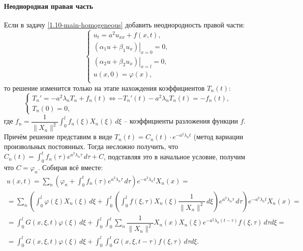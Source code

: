 \paragraph{Неоднородная правая часть} Если в задачу \eqref{1.10-main-homogeneous} добавить 
неоднородность правой части:
\begin{equation}
  \begin{cases}
    u_t = a^2 u_{xx} + f(x, t), \\
    \left. \left( \alpha_1 u + \beta_1 u_x \right) \right|_{x=0} = 0, \\
    \left. \left( \alpha_2 u + \beta_2 u_x \right) \right|_{x = l} = 0, \\
    u(x, 0) = \varphi(x), \\
  \end{cases}
\end{equation}
то решение изменится только на этапе нахождения коэффициентов $T_n(t)$:
\[
  \begin{cases}
    T_n' = - a^2 \lambda_n T_n + f_n(t)
      \Leftrightarrow
      -T_n'(t) - a^2 \lambda_n T_n(t) = - f_n(t), \\
    T_n(0) = 0,
  \end{cases}
\]
где $f_n = \dfrac{1}{\|X_n\|^2} \int_0^l f_n(\xi) X_n(\xi) \, d\xi$ -- коэффициенты разложения
функции $f$. Причём решение представим в виде $T_n(t) = C_n(t) \cdot e^{-a^2 \lambda_n t}$
(метод вариации произвольных постоянных. Тогда несложно получить, что
$C_n(t) = \int_0^t f_n(\tau) e^{a^2 \lambda_n \tau} \, d\tau + C$, подставляя это в начальное
условие, получим что $C = \varphi_n$. Собирая всё вместе:
\begin{multline*}
  u(x, t)
  = \sum_n \left( \varphi_n + \int_0^t f_n(\tau) e^{a^2 \lambda_n \tau} \, d\tau \right) e^{-a^2 \lambda_n t}  X_n(x) = \\
  = \sum_n \left( \int_0^l \varphi(\xi) X_n(\xi) \, d\xi
    + \int_0^t \left( \int_0^l f(\xi, \tau) X_n(\xi) \dfrac{1}{\| X_n \|^2} \, d\xi 
    \right) e^{a^2 \lambda_n \tau} \, d\tau \right) e^{-a^2 \lambda_n t} X_n(x) = \\
  = \int_0^l G(x, \xi, t) \varphi(\xi) \, d\xi
  + \int_0^l \int_0^t \sum_n \dfrac{1}{\|X_n\|^2} X_n(x) X_n(\xi) e^{-a^2 \lambda_n (t-\tau)} f(\xi, \tau) \, d\tau d\xi = \\
  = \int_0^l G(x, \xi, t) \varphi(\xi) \, d\xi
    + \int_0^l \int_0^t G(x, \xi, t-\tau) f(\xi, \tau) \, d\tau d\xi.
\end{multline*}
